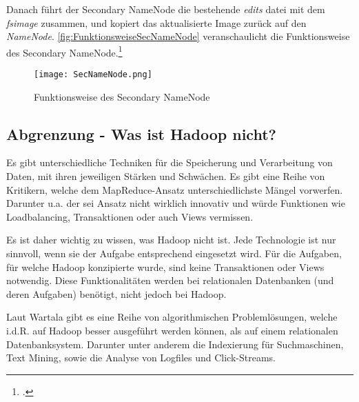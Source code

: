 \newpage
Danach führt der Secondary NameNode die bestehende \textit{edits} datei mit dem \textit{fsimage} zusammen, und kopiert das aktualisierte Image zurück auf den \textit{NameNode}. \autoref{fig:FunktionsweiseSecNameNode} veranschaulicht die Funktionsweise des Secondary NameNode.\footcite[Vgl.][S. 23]{Lakhe.2014} \\

\begin{figure}[h]
	\texttt{[image: SecNameNode.png]}
	\caption{Funktionsweise des Secondary NameNode\footnotemark}
	\label{fig:FunktionsweiseSecNameNode}
\end{figure}



\subsection{Abgrenzung - Was ist Hadoop nicht?}
Es gibt unterschiedliche Techniken für die Speicherung und Verarbeitung von Daten, mit ihren jeweiligen Stärken und Schwächen. Es gibt eine Reihe von Kritikern, welche dem MapReduce-Ansatz unterschiedlichste Mängel vorwerfen. Darunter u.a. der sei Ansatz nicht wirklich innovativ und würde Funktionen wie Loadbalancing, Transaktionen oder auch Views vermissen.

Es ist daher wichtig zu wissen, was Hadoop nicht ist. Jede Technologie ist nur sinnvoll, wenn sie der Aufgabe entsprechend eingesetzt wird. Für die Aufgaben, für welche Hadoop konzipierte wurde, sind keine Transaktionen oder Views notwendig. Diese Funktionalitäten werden bei relationalen Datenbanken (und deren Aufgaben) benötigt, nicht jedoch bei Hadoop.

Laut Wartala gibt es eine Reihe von algorithmischen Problemlösungen, welche i.d.R. auf Hadoop besser ausgeführt werden können, als auf einem relationalen Datenbanksystem. Darunter unter anderem die Indexierung für Suchmaschinen, Text Mining, sowie die Analyse von Logfiles und Click-Streams.

